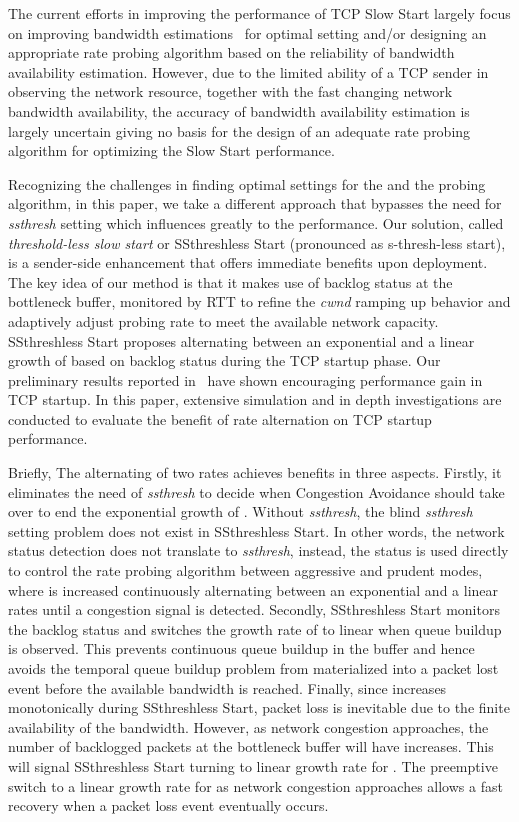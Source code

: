 \documentclass[12pt,onecolumn]{IEEEtran}
\begin{document}
The current efforts in improving the performance of TCP Slow Start largely
focus on improving bandwidth
estimations~\cite{buffer1,buffer2,buffer3,westwood,RCE} for optimal 
setting and/or designing an appropriate rate probing algorithm based on the
reliability of bandwidth availability estimation. However, due to the limited
ability of a TCP sender in observing the network resource, together with the
fast changing network bandwidth availability, the accuracy of bandwidth
availability estimation is largely uncertain giving no basis for the design of
an adequate rate probing algorithm for optimizing the Slow Start performance.

Recognizing the challenges in finding optimal settings for the  and
the probing algorithm, in this paper, we take a different approach that
bypasses the need for \emph{ssthresh} setting which influences greatly to the
performance. Our solution, called \emph{threshold-less slow start} or
SSthreshless Start (pronounced as s-thresh-less start), is a sender-side
enhancement that offers immediate benefits upon deployment. The key idea of our
method is that it makes use of backlog status at the bottleneck buffer,
monitored by RTT to refine the \emph{cwnd} ramping up behavior and adaptively
adjust probing rate to meet the available network capacity. SSthreshless Start
proposes alternating between an exponential and a linear growth of  based
on backlog status during the TCP startup phase. Our preliminary results
reported in~\cite{Lu2010} have shown encouraging performance gain in TCP
startup. In this paper, extensive simulation and in depth investigations are
conducted to evaluate the benefit of rate alternation on TCP startup
performance.

Briefly, The alternating of two rates achieves benefits in three aspects.
Firstly, it eliminates the need of \emph{ssthresh} to decide when Congestion
Avoidance should take over to end the exponential growth of . Without
\emph{ssthresh}, the blind \emph{ssthresh} setting problem does not exist in
SSthreshless Start. In other words, the network status detection does not
translate to \emph{ssthresh}, instead, the status is used directly to control
the rate probing algorithm between aggressive and prudent modes, where 
is increased continuously alternating between an exponential and a linear rates
until a congestion signal is detected. Secondly, SSthreshless Start monitors
the backlog status and switches the growth rate of  to linear when queue
buildup is observed. This prevents continuous queue buildup in the buffer and
hence avoids the temporal queue buildup problem from materialized into a packet
lost event before the available bandwidth is reached. Finally, since 
increases monotonically during SSthreshless Start, packet loss is inevitable
due to the finite availability of the bandwidth. However, as network congestion
approaches, the number of backlogged packets at the bottleneck buffer will have
increases. This will signal SSthreshless Start turning to linear growth rate
for . The preemptive switch to a linear growth rate for  as network
congestion approaches allows a fast recovery when a packet loss event
eventually occurs.
\end{document}
